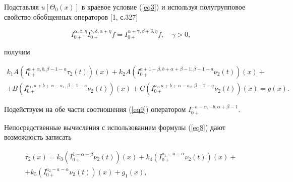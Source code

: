 Подставляя $u[\Theta_{0}(x)]$ в краевое условие (\ref{eq3}) и используя полугрупповое свойство обобщенных операторов [1, с.327]

\begin{equation}

       \label{eq8}

I_{0+}^{\alpha, \beta, \eta} I_{0+}^{\gamma, \delta,\alpha+\eta} f= I_{0+}^{\alpha+\gamma, \beta+\delta, \eta}f, \quad \gamma>0,

\end{equation}

получим

\begin{equation}

       \label{eq9}{\begin{array}{l}

k_{1}A \left( I_{0+}^{a+\alpha, b,  \beta-1-a} \tau_{2}(t) \right) (x) + k_{2}A \left( I_{0+}^{a+1-\beta, b+\alpha+\beta-1, \beta-1-a} \nu_{2}(t) \right) (x)+\\

 + B\left( I_{0+}^{a_{1}, a+b+\alpha-a_{1}, \beta-1-a} \nu_{2}(t) \right) (x)+ C \left( I_{0+}^{a_{2}, a+b+\alpha-a_{2}, \beta-1-a} \nu_{2}(t) \right) (x)=g(x).

\end{array}}

\end{equation}



Подействуем на обе части соотношения (\ref{eq9}) оператором $I_{0+}^{-a-\alpha,-b, \alpha+\beta-1}$.



Непосредственные вычисления с использованием формулы (\ref{eq8}) дают возможность записать

\begin{equation}

       \label{eq10} {\begin{array}{l}

\displaystyle \tau_{2}(x)=k_{3} \left( I_{0+}^{1-\alpha- \beta} \nu_{2}(t) \right) (x) + k_{4} \left( I_{0+}^{a_{1}-a-\alpha} \nu_{2}(t) \right) (x)+\\

\displaystyle  + k_{5}\left( I_{0+}^{a_{2}- a-\alpha} \nu_{2}(t) \right) (x)+ g_{1}(x),

\end{array}}

\end{equation}


